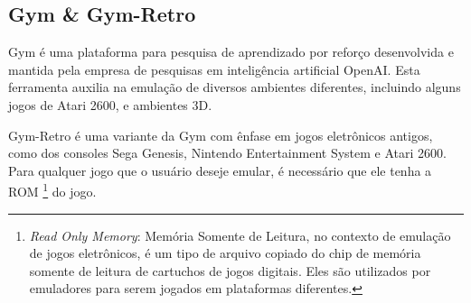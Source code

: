 %
%


\subsection{Gym \& Gym-Retro}
\label{sec:gymretro}

Gym é uma plataforma para pesquisa de aprendizado por reforço desenvolvida e mantida pela empresa de pesquisas em inteligência artificial OpenAI.
Esta ferramenta auxilia na emulação de diversos ambientes diferentes, incluindo alguns jogos de Atari 2600, e ambientes 3D.

Gym-Retro é uma variante da Gym com ênfase em jogos eletrônicos antigos, como dos consoles Sega Genesis, Nintendo Entertainment System e Atari 2600.
Para qualquer jogo que o usuário deseje emular, é necessário que ele tenha a ROM \footnote{\textit{Read Only Memory}: Memória Somente de Leitura, no contexto de emulação de jogos eletrônicos, é um tipo de arquivo copiado do chip de memória somente de leitura de cartuchos de jogos digitais. Eles são utilizados por emuladores para serem jogados em plataformas diferentes.} do jogo.

